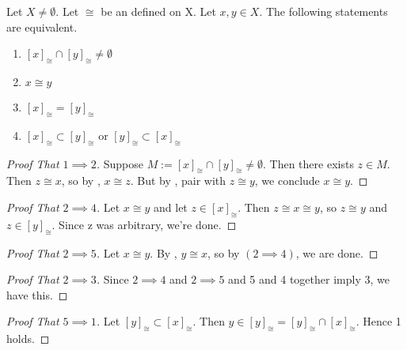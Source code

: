 \begin{prop}
    \label{prop:EquivalenceClassesPartition}
\rm
    Let $X \neq \emptyset$. 
    Let $\cong$ be an 
	\EquivalenceRelation
	defined on X. 
    Let $x,y \in X$. 
    The following statements are equivalent. 
    \begin{enumerate}[label=(\roman*), ref={\ref{prop:EquivalenceClassesPartition}.~\roman*}]
        \item 
		\label{prop:EquivalenceClass:NonDisjoint}
		$[x]_{\cong}  \cap [y]_{\cong} \neq \emptyset$
        \item 
		\label{prop:EquivalenceClass:Related}
		$x \cong y$
        \item 
		\label{prop:EquivalenceClass:EqualClass}
		$[x]_{\cong} = [y]_{\cong}$
        \item 
		\label{prop:EquivalenceClass:Subset}
		$[x]_{\cong} \subset [y]_{\cong}$ or $[y]_{\cong} \subset [x]_{\cong}$  
    \end{enumerate}
    
\begin{proof}[Proof That $1 \implies 2$]
Suppose $M:=[x]_{\cong} \cap [y]_{\cong} \neq \emptyset$. 
Then there exists $z \in M$.
Then $z \cong x$, so by \RelationSymmetry, $x \cong z$. 
But by \RelationTransitivity, pair with $z \cong y$, we conclude $x \cong y$. 
\end{proof}
\begin{proof}[Proof That $2 \implies 4$]
    Let $x \cong y$ and let $z \in [x]_{\cong}$. 
    Then $z \cong x \cong y$, so $z \cong y$ and $z \in [y]_{\cong}$.
    Since z was arbitrary, we're done. 
\end{proof}
\begin{proof}[Proof That $2 \implies 5$]
    Let $x \cong y$. By 
	\RelationSymmetry, $y \cong x$, so by $(2 \implies 4)$, we are done. 
\end{proof}
\begin{proof}[Proof That $2 \implies 3$]
    Since  $2 \implies 4$ and $2 \implies 5$ and 5 and 4 together imply 3, we have this. 
\end{proof}
\begin{proof}[Proof That $5 \implies 1$]
    Let $[y]_{\cong} \subset [x]_{\cong}$. 
    Then $y \in [y]_{\cong} = [y]_{\cong} \cap [x]_{\cong} $.
    Hence 1 holds. 
\end{proof}

\end{prop} 
